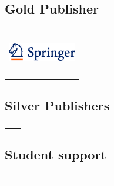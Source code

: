 \subsection*{Gold Publisher}

\begin{tabular}{C{\linewidth}}
\includegraphics[width=3cm,height=2cm,keepaspectratio]{sponsoricons/springer}
\end{tabular}

\subsection*{Silver Publishers}

\begin{tabular}{C{.45\textwidth}C{.45\textwidth}}
&
\end{tabular}

\subsection*{Student support}

\begin{tabular}{C{.45\textwidth}C{.45\textwidth}}
&
\\
&
\end{tabular}





